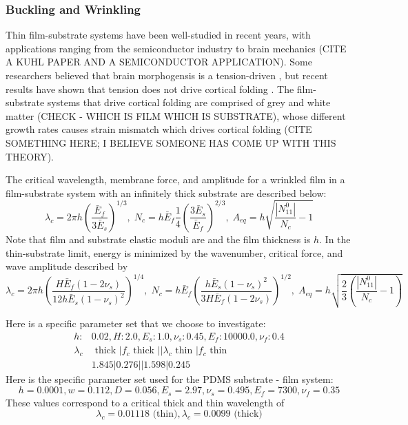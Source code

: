 \documentclass{article}
\begin{document}
\subsubsection{Buckling and Wrinkling}\label{subsec:wrinkling_modeling}
Thin film-substrate systems have been well-studied in recent years, with applications ranging from the semiconductor industry to brain mechanics \cite{yu_harnessing_2018, nikravesh_direct_2019, pandurangi_mechanics_2015,chen_buckling_2010, jin_mechanics_2015, huang_nonlinear_2005} (CITE A KUHL PAPER AND A SEMICONDUCTOR APPLICATION). Some researchers believed that brain morphogensis is a tension-driven \cite{essen_tension-based_1997}, but recent results have shown that tension does not drive cortical folding \cite{xu_axons_2010}. The film-substrate systems that drive cortical folding are comprised of grey and white matter (CHECK - WHICH IS FILM WHICH IS SUBSTRATE), whose different growth rates causes strain mismatch which drives cortical folding (CITE SOMETHING HERE; I BELIEVE SOMEONE HAS COME UP WITH THIS THEORY).

The critical wavelength, membrane force, and amplitude for a wrinkled film in a film-substrate system with an infinitely thick substrate are described below:
\begin{equation}\label{eqn:wavenumber_thicksubstrate}
    \lambda_c = 2\pi h \left ( \frac{\bar{E}_f}{3 \bar{E}_s} \right ) ^{1/3}, \;
    N_c = h \bar{E}_f \frac{1}{4} \left( \frac{3 \bar{E}_s}{\bar{E}_f} \right)^{2/3}, \;
    A_{eq} = h \sqrt{\frac{|N^0_{11}|}{N_c} - 1}
\end{equation}
Note that film and substrate elastic moduli are and the film thickness is $h$. In the thin-substrate limit, energy is minimized by the wavenumber, critical force, and wave amplitude described by 
\begin{equation}\label{eqn:wavenumber_thinsubstrate}
    \lambda_c = 2\pi h \left ( \frac{H\bar{E}_f(1 - 2\nu_s)}{12h \bar{E}_s (1 - \nu_s)^2} \right ) ^{1/4}, \;
    N_c = h \bar{E}_f \left( \frac{h \bar{E}_s (1 - \nu_s)^2}{3H\bar{E}_f(1 - 2\nu_s)} \right)^{1/2}, \;
    A_{eq} = h \sqrt{\frac{2}{3}\left(\frac{|N^0_{11}|}{N_c} - 1\right)}
\end{equation}

Here is a specific parameter set that we choose to investigate:
\begin{align}
    h:& 0.02, H:2.0, E_s:1.0, \nu_s:0.45, E_f:10000.0, \nu_f:0.4       \\
    \lambda_c& \text{ thick } | f_c \text{ thick } || \lambda_c \text{ thin } | f_c \text{ thin } \\
    & 1.845 | 0.276 || 1.598 | 0.245
\end{align}
Here is the specific parameter set used for the PDMS substrate - film system:
\begin{equation}
    h=0.0001, w=0.112, D=0.056, E_s=2.97, \nu_s=0.495, E_f=7300, \nu_f=0.35
\end{equation}
These values correspond to a critical thick and thin wavelength of
\begin{equation}
    \lambda_c = 0.01118 \text{ (thin)}, \lambda_c = 0.0099 \text{ (thick)}
\end{equation}
\end{document}
